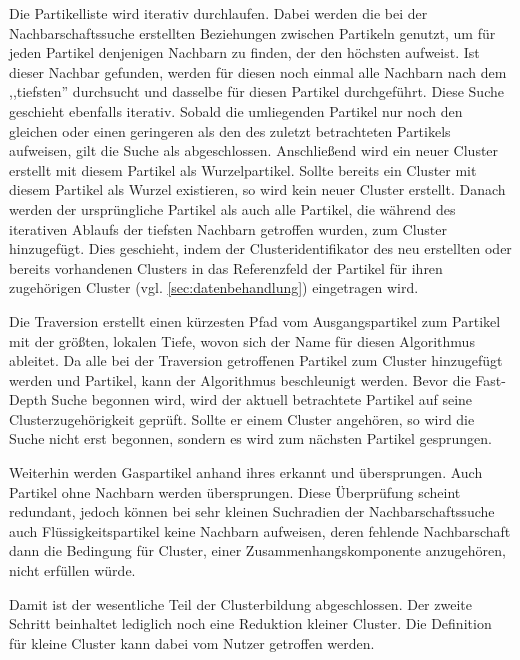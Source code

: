 Die Partikelliste wird iterativ durchlaufen. Dabei werden die bei der Nachbarschaftssuche erstellten Beziehungen zwischen Partikeln genutzt, um für jeden Partikel denjenigen Nachbarn zu finden, der den höchsten  aufweist. Ist dieser Nachbar gefunden, werden für diesen noch einmal alle Nachbarn nach dem ,,tiefsten'' durchsucht und dasselbe für diesen Partikel durchgeführt. Diese Suche geschieht ebenfalls iterativ. Sobald die umliegenden Partikel nur noch den gleichen oder einen geringeren  als den des zuletzt betrachteten Partikels aufweisen, gilt die Suche als abgeschlossen. Anschließend wird ein neuer Cluster erstellt mit diesem Partikel als Wurzelpartikel. Sollte bereits ein Cluster mit diesem Partikel als Wurzel existieren, so wird kein neuer Cluster erstellt. Danach werden der ursprüngliche Partikel als auch alle Partikel, die während des iterativen Ablaufs der tiefsten Nachbarn getroffen wurden, zum Cluster hinzugefügt. Dies geschieht, indem der Clusteridentifikator des neu erstellten oder bereits vorhandenen Clusters in das Referenzfeld der Partikel für ihren zugehörigen Cluster (vgl. \autoref{sec:datenbehandlung}) eingetragen wird. %

Die Traversion erstellt einen kürzesten Pfad vom Ausgangspartikel zum Partikel mit der größten, lokalen Tiefe, wovon sich der Name für diesen Algorithmus ableitet. Da alle bei der Traversion getroffenen Partikel zum Cluster hinzugefügt werden und Partikel, kann der Algorithmus beschleunigt werden. Bevor die Fast-Depth Suche begonnen wird, wird der aktuell betrachtete Partikel auf seine Clusterzugehörigkeit geprüft. Sollte er einem Cluster angehören, so wird die Suche nicht erst begonnen, sondern es wird zum nächsten Partikel gesprungen.

Weiterhin werden Gaspartikel anhand ihres  erkannt und übersprungen. Auch Partikel ohne Nachbarn werden übersprungen. Diese Überprüfung scheint redundant, jedoch können bei sehr kleinen Suchradien der Nachbarschaftssuche auch Flüssigkeitspartikel keine Nachbarn aufweisen, deren fehlende Nachbarschaft dann die Bedingung für Cluster, einer Zusammenhangskomponente anzugehören, nicht erfüllen würde.

Damit ist der wesentliche Teil der Clusterbildung abgeschlossen. Der zweite Schritt beinhaltet lediglich noch eine Reduktion kleiner Cluster. Die Definition für kleine Cluster kann dabei vom Nutzer getroffen werden.

